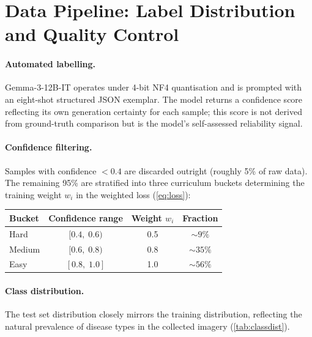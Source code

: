 \documentclass{article}
\begin{document}
\section{Data Pipeline: Label Distribution and Quality Control}
\label{app:datapipeline}

\paragraph{Automated labelling.}
Gemma-3-12B-IT operates under 4-bit NF4 quantisation
\citep{dettmers2024qlora} and is prompted with an eight-shot structured
JSON exemplar.
The model returns a confidence score reflecting its own generation
certainty for each sample; this score is not derived from ground-truth
comparison but is the model's self-assessed reliability signal.

\paragraph{Confidence filtering.}
Samples with confidence $< 0.4$ are discarded outright (roughly 5\%
of raw data).
The remaining 95\% are stratified into three curriculum buckets
determining the training weight $w_i$ in the weighted loss
(\cref{eq:loss}):

\begin{center}
\small
\begin{tabular}{@{}lccc@{}}
\toprule
\textbf{Bucket} & \textbf{Confidence range} & \textbf{Weight $w_i$}
  & \textbf{Fraction} \\
\midrule
Hard   & $[0.4,\; 0.6)$ & 0.5 & ${\sim}9\%$ \\
Medium & $[0.6,\; 0.8)$ & 0.8 & ${\sim}35\%$ \\
Easy   & $[0.8,\; 1.0]$ & 1.0 & ${\sim}56\%$ \\
\bottomrule
\end{tabular}
\end{center}

\paragraph{Class distribution.}
The test set distribution closely mirrors the training distribution,
reflecting the natural prevalence of disease types in the collected
imagery (\cref{tab:classdist}).
\end{document}
